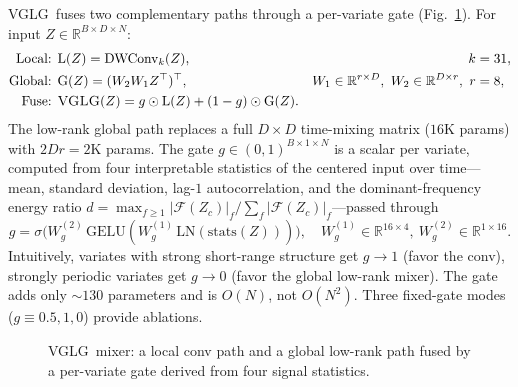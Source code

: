 \documentclass[11pt]{article}
\newcommand{\vglg}{\textsc{VGLG}}
\begin{document}
\vglg\ fuses two complementary paths through a per-variate gate
(Fig.~\ref{fig:vglg}). For input $Z\in\mathbb{R}^{B\times D\times N}$:
\begin{align}
\text{Local: } & \mathrm{L}(Z)=\mathrm{DWConv}_{k}(Z), & k&=31,\\
\text{Global: } & \mathrm{G}(Z)=(W_2 W_1 Z^\top)^\top, & W_1\in\mathbb{R}^{r\times D},\ W_2\in\mathbb{R}^{D\times r},\ r&=8,\\
\text{Fuse: } & \mathrm{\vglg}(Z)=g\odot\mathrm{L}(Z)+(1-g)\odot\mathrm{G}(Z).
\end{align}
The low-rank global path replaces a full $D\times D$ time-mixing matrix
($16$K params) with $2Dr=2$K params. The gate $g\in(0,1)^{B\times1\times N}$ is a
scalar per variate, computed from four interpretable statistics of the centered
input over time---mean, standard deviation, lag-$1$ autocorrelation, and the
dominant-frequency energy ratio
$d=\max_{f\ge1}|\mathcal{F}(Z_c)|_f / \sum_f |\mathcal{F}(Z_c)|_f$---passed through
\begin{equation}
g=\sigma\!\big(W_g^{(2)}\,\mathrm{GELU}(W_g^{(1)}\,\mathrm{LN}(\mathrm{stats}(Z)))\big),
\quad W_g^{(1)}\in\mathbb{R}^{16\times4},\ W_g^{(2)}\in\mathbb{R}^{1\times16}.
\end{equation}
Intuitively, variates with strong short-range structure get $g\!\to\!1$ (favor the
conv), strongly periodic variates get $g\!\to\!0$ (favor the global low-rank
mixer). The gate adds only $\sim\!130$ parameters and is $O(N)$, not $O(N^2)$.
Three fixed-gate modes ($g{\equiv}0.5,1,0$) provide ablations.

\begin{figure}[t]
\centering
{}
\caption{\vglg\ mixer: a local conv path and a global low-rank path fused by a
per-variate gate derived from four signal statistics.}
\label{fig:vglg}
\end{figure}
\end{document}
